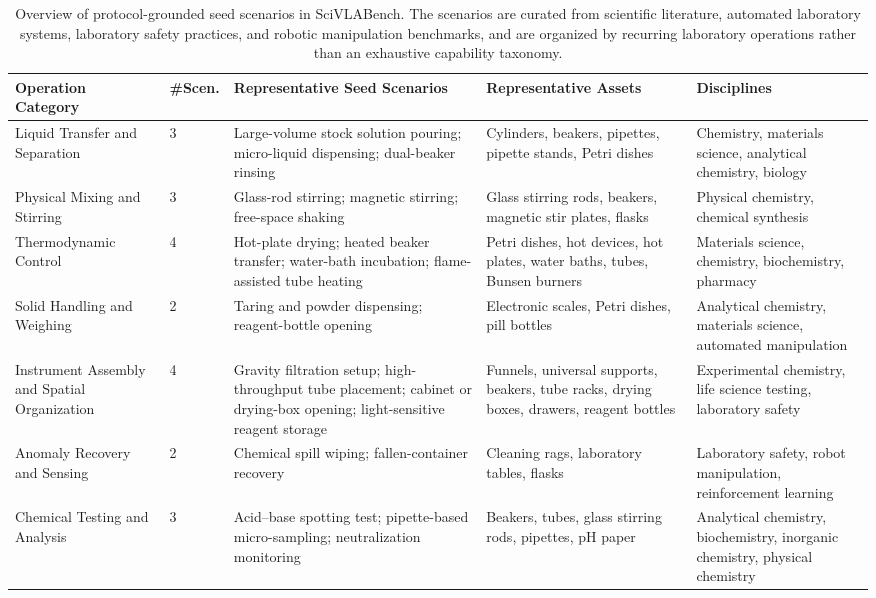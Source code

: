 \begin{table}[t]
  \centering
  \caption{Overview of protocol-grounded seed scenarios in SciVLABench. The scenarios are curated from scientific literature, automated laboratory systems, laboratory safety practices, and robotic manipulation benchmarks, and are organized by recurring laboratory operations rather than an exhaustive capability taxonomy.}
  \label{tab:seed-scenarios}
  \begin{tabular}{p{2.5cm} p{0.7cm} p{3.8cm} p{3.5cm} p{2.5cm}}
    \toprule
    \textbf{Operation Category} & \textbf{\#Scen.} & \textbf{Representative Seed Scenarios} & \textbf{Representative Assets} & \textbf{Disciplines} \\
    \midrule
    Liquid Transfer and Separation
    & 3
    & Large-volume stock solution pouring; micro-liquid dispensing; dual-beaker rinsing
    & Cylinders, beakers, pipettes, pipette stands, Petri dishes
    & Chemistry, materials science, analytical chemistry, biology \\
    \midrule
    Physical Mixing and Stirring
    & 3
    & Glass-rod stirring; magnetic stirring; free-space shaking
    & Glass stirring rods, beakers, magnetic stir plates, flasks
    & Physical chemistry, chemical synthesis \\
    \midrule
    Thermodynamic Control
    & 4
    & Hot-plate drying; heated beaker transfer; water-bath incubation; flame-assisted tube heating
    & Petri dishes, hot devices, hot plates, water baths, tubes, Bunsen burners
    & Materials science, chemistry, biochemistry, pharmacy \\
    \midrule
    Solid Handling and Weighing
    & 2
    & Taring and powder dispensing; reagent-bottle opening
    & Electronic scales, Petri dishes, pill bottles
    & Analytical chemistry, materials science, automated manipulation \\
    \midrule
    Instrument Assembly and Spatial Organization
    & 4
    & Gravity filtration setup; high-throughput tube placement; cabinet or drying-box opening; light-sensitive reagent storage
    & Funnels, universal supports, beakers, tube racks, drying boxes, drawers, reagent bottles
    & Experimental chemistry, life science testing, laboratory safety \\
    \midrule
    Anomaly Recovery and Sensing
    & 2
    & Chemical spill wiping; fallen-container recovery
    & Cleaning rags, laboratory tables, flasks
    & Laboratory safety, robot manipulation, reinforcement learning \\
    \midrule
    Chemical Testing and Analysis
    & 3
    & Acid--base spotting test; pipette-based micro-sampling; neutralization monitoring
    & Beakers, tubes, glass stirring rods, pipettes, pH paper
    & Analytical chemistry, biochemistry, inorganic chemistry, physical chemistry \\
    \bottomrule
  \end{tabular}
\end{table}
